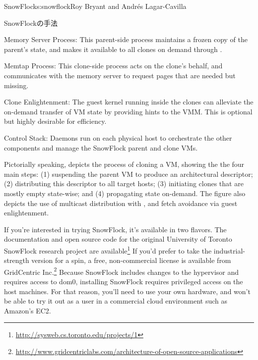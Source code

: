 \begin{aosachapter}{SnowFlock}{s:snowflock}{Roy Bryant and Andr\'e{s} Lagar-Cavilla}
\begin{aosasect1}{SnowFlockの手法}
\begin{aosaitemize}
  \item Memory Server Process: This parent-side process maintains a
  frozen copy of the parent's state, and makes it available to all
  clones on demand through .

  \item Memtap Process: This clone-side process acts on the clone's
  behalf, and communicates with the memory server to request pages
  that are needed but missing.

  \item Clone Enlightenment: The guest kernel running inside the
  clones can alleviate the on-demand transfer of VM state by
  providing hints to the VMM\@. This is optional but highly desirable
  for efficiency.

  \item Control Stack: Daemons run on each physical host to
  orchestrate the other components and manage the SnowFlock parent and clone VMs.

\end{aosaitemize}


Pictorially speaking,  depicts the
process of cloning a VM, showing the the four main steps: (1)
suspending the parent VM to produce an architectural descriptor; (2)
distributing this descriptor to all target hosts; (3) initiating
clones that are mostly empty state-wise; and (4) propagating state
on-demand. The figure also depicts the use of multicast distribution
with , and fetch avoidance via guest enlightenment.

If you're interested in trying SnowFlock, it's available in two
flavors.  The documentation and open source code for the original
University of Toronto SnowFlock research project are
available\footnote{\url{http://sysweb.cs.toronto.edu/projects/1}}
If you'd prefer to take
the industrial-strength version for a spin, a free, non-commercial
license is available from GridCentric 
Inc.\footnote{\url{http://www.gridcentriclabs.com/architecture-of-open-source-applications}}
Because SnowFlock includes changes to the hypervisor and requires
access to dom0, installing SnowFlock requires privileged access on the
host machines. For that reason, you'll need to use your own hardware,
and won't be able to try it out as a user in a commercial cloud
environment such as Amazon's EC2.


\end{aosasect1}
\end{aosachapter}
